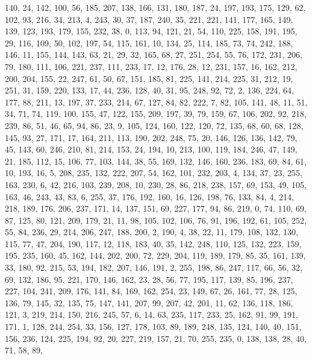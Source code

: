 \begin{DoxyCode}
       140, 24, 142, 100, 56, 185, 207, 138, 166, 131, 180, 187, 24, 197, 193, 175, 129, 62, 102, 93, 216, 34, 213,
       4, 243, 30, 37, 187, 240, 35, 221, 221, 141, 177, 165, 149, 139, 123, 193, 179, 155, 232, 38, 0, 113, 94,
       121, 21, 54, 110, 225, 158, 191, 195, 29, 116, 109, 50, 102, 197, 54, 115, 161, 10, 134, 25, 114, 185, 73,
       74, 242, 188, 146, 11, 155, 144, 143, 63, 21, 29, 32, 165, 68, 27, 251, 254, 55, 76, 172, 231, 206, 79, 180,
       111, 106, 221, 237, 111, 233, 17, 12, 176, 28, 12, 231, 157, 16, 162, 212, 200, 204, 155, 22, 247, 61, 50,
       67, 151, 185, 81, 225, 141, 214, 225, 31, 212, 19, 251, 31, 159, 220, 133, 17, 44, 236, 128, 40, 31, 95, 248,
       92, 72, 2, 136, 224, 64, 177, 88, 211, 13, 197, 37, 233, 214, 67, 127, 84, 82, 222, 7, 82, 105, 141, 48, 11,
       51, 34, 71, 74, 119, 100, 155, 47, 122, 155, 209, 197, 39, 79, 159, 67, 106, 202, 92, 218, 239, 86, 51, 46,
       65, 94, 86, 23, 9, 105, 124, 160, 122, 120, 72, 135, 68, 60, 68, 128, 145, 93, 27, 171, 17, 164, 211, 113,
       190, 202, 248, 75, 20, 146, 126, 136, 142, 79, 45, 143, 60, 246, 210, 81, 214, 153, 24, 194, 10, 213, 100,
       119, 184, 246, 47, 149, 21, 185, 112, 15, 106, 77, 103, 144, 38, 55, 169, 132, 146, 160, 236, 183, 69, 84,
       61, 10, 193, 16, 5, 208, 235, 132, 222, 207, 54, 162, 101, 232, 203, 4, 134, 37, 23, 255, 163, 230, 6, 42,
       216, 103, 239, 208, 10, 230, 28, 86, 218, 238, 157, 69, 153, 49, 105, 163, 46, 243, 43, 83, 6, 255, 37, 176,
       192, 160, 16, 126, 198, 76, 133, 84, 4, 214, 218, 189, 176, 206, 237, 171, 14, 137, 151, 69, 227, 177, 94, 86,
       219, 0, 74, 110, 69, 87, 125, 80, 121, 209, 179, 21, 11, 98, 105, 102, 106, 76, 91, 196, 192, 61, 105, 252,
       55, 84, 236, 29, 214, 206, 247, 188, 200, 2, 190, 4, 38, 22, 11, 179, 108, 132, 130, 115, 77, 47, 204, 190,
       117, 12, 118, 183, 40, 35, 142, 248, 110, 125, 132, 223, 159, 195, 235, 160, 45, 162, 144, 202, 200, 72,
       229, 204, 119, 189, 179, 85, 35, 161, 139, 33, 180, 92, 215, 53, 194, 182, 207, 146, 191, 2, 255, 198, 86,
       247, 117, 66, 56, 32, 69, 132, 186, 95, 221, 170, 146, 162, 23, 28, 56, 77, 195, 117, 139, 85, 196, 237, 227,
       104, 241, 209, 176, 141, 84, 169, 162, 254, 23, 149, 67, 26, 161, 77, 28, 125, 136, 79, 145, 32, 135, 75,
       147, 141, 207, 99, 207, 42, 201, 11, 62, 136, 118, 186, 121, 3, 219, 214, 150, 216, 245, 57, 6, 14, 63, 235,
       117, 233, 25, 162, 91, 99, 191, 171, 1, 128, 244, 254, 33, 156, 127, 178, 103, 89, 189, 248, 135, 124, 140,
       40, 151, 156, 236, 124, 225, 194, 92, 20, 227, 219, 157, 21, 70, 255, 235, 0, 138, 138, 28, 40, 71, 58, 89,

\end{DoxyCode}
